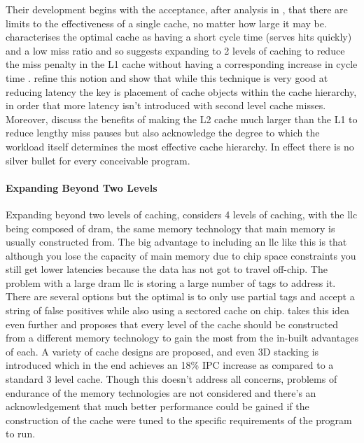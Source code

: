Their development begins with the acceptance, after analysis in \citet{przybylskiPerformanceTradeoffsCache1988}, that there are limits to the effectiveness of a single cache, no matter how large it may be. \citet{przybylskiCharacteristicsPerformanceOptimalMultilevel1989} characterises the optimal cache as having a short cycle time (serves hits quickly) and a low miss ratio and so suggests expanding to 2 levels of caching to reduce the miss penalty in the L1 cache without having a corresponding increase in cycle time \cite{jouppiTradeoffsTwolevelOnchip1994}. \citet{azimiTwoLevelCache1992} refine this notion and show that while this technique is very good at reducing latency the key is placement of cache objects within the cache hierarchy, in order that more latency isn't introduced with second level cache misses. Moreover, \citet{tangPerformanceDesignChoices1994} discuss the benefits of making the L2 cache much larger than the L1 to reduce lengthy miss pauses but also acknowledge the degree to which the workload itself determines the most effective cache hierarchy. In effect there is no silver bullet for every conceivable program. 

\paragraph{Expanding Beyond Two Levels}

Expanding beyond two levels of caching, \citet{zhaoExploringDRAMCache2007} considers 4 levels of caching, with the \gls{llc} being composed of \gls{dram}, the same memory technology that main memory is usually constructed from. The big advantage to including an \gls{llc} like this is that although you lose the capacity of main memory due to chip space constraints you still get lower latencies because the data has not got to travel off-chip. The problem with a large \gls{dram} \gls{llc} is storing a large number of tags to address it. There are several options but the optimal is to only use partial tags and accept a string of false positives while also using a sectored cache on chip. \citet{wuHybridCacheArchitecture2009} takes this idea even further and proposes that every level of the cache should be constructed from a different memory technology to gain the most from the in-built advantages of each. A variety of cache designs are proposed, and even 3D stacking is introduced which in the end achieves an 18\% IPC increase as compared to a standard 3 level cache. Though this doesn't address all concerns, problems of endurance of the memory technologies are not considered and there's an acknowledgement that much better performance could be gained if the construction of the cache were tuned to the specific requirements of the program to run. 

